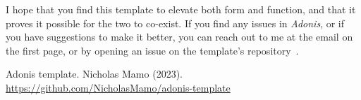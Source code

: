 \documentclass[12pt]{article}
\begin{document}
		I hope that you find this template to elevate both form and function, and that it proves it possible for the two to co-exist.
		If you find any issues in \textit{Adonis}, or if you have suggestions to make it better, you can reach out to me at the email on the first page, or by opening an issue on the template's repository~\cite{repository}.
    
	\begin{thebibliography}{5}
		Adonis template. Nicholas Mamo (2023). \url{https://github.com/NicholasMamo/adonis-template}
	\end{thebibliography}
	
\end{document}
